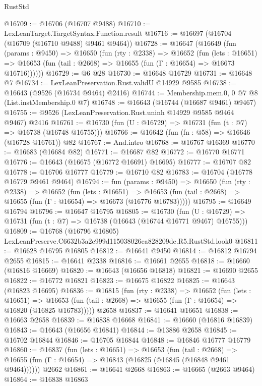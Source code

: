 \begin{lexlean}{RustStd}
\begin{coremodule}
@16709 := @16706 (@16707 @9488)
@16710 := LexLeanTarget.TargetSyntax.Function.result
@16716 := @16697 (@16704 (@16709 (@16710 @9488) @9461 @9464))
@16728 := @16647
    (@16649
      (fun (params : @9450) =>
      @16650
        (fun (rty : @2338) =>
        @16652
          (fun (lets : @16651) =>
          @16653 (fun (tail : @2668) => @16655 (fun (Γ : @16654) => @16673 @16716))))))
@16729 := @6 @28
@16730 := @16648 @16729
@16731 := @16648 @7
@16734 := LexLeanPreservation.Rust.validU @14929 @9585
@16738 := @16643 (@9526 (@16734 @9464) @2416)
@16744 := Membership.mem.{0, 0} @7 @8 (List.instMembership.{0} @7)
@16748 := @16643 (@16744 (@16687 @9461) @9467)
@16755 := @9526 (LexLeanPreservation.Rust.uninh @14929 @9585 @9464 @9467) @2416
@16761 := @16730 (fun (U : @16729) => @16731 (fun (t : @7) => @16738 (@16748 @16755)))
@16766 := @16642 (fun (fn : @58) => @16646 (@16728 @16761)) @82
@16767 := And.intro
@16768 := @16767 @16369
@16770 := @16683 (@16684 @82)
@16771 := @16687 @82
@16772 := @16770 @16771
@16776 := @16643 (@16675 (@16772 @16691) @16695)
@16777 := @16707 @82
@16778 := @16706 @16777
@16779 := @16710 @82
@16783 := @16704 (@16778 @16779 @9461 @9464)
@16794 := fun (params : @9450) =>
  @16650
    (fun (rty : @2338) =>
    @16652
      (fun (lets : @16651) =>
      @16653 (fun (tail : @2668) => @16655 (fun (Γ : @16654) => @16673 (@16776 @16783)))))
@16795 := @16649 @16794
@16796 := @16647 @16795
@16805 := @16730
    (fun (U : @16729) => @16731 (fun (t : @7) => @16738 (@16643 (@16744 @16771 @9467) @16755)))
@16809 := @16768 (@16796 @16805) LexLeanPreserve.C6632b3a2e999d115038026ca828209de.R5.RustStd.look0
@16811 := @16628 @16795 @16805
@16812 := @16641 @9450
@16814 := @16812 @16794 @2655
@16815 := @16641 @2338
@16816 := @16661 @2655
@16818 := @16660 (@16816 @16669)
@16820 := @16643 (@16656 @16818)
@16821 := @16690 @2655
@16822 := @16772 @16821
@16823 := @16675 @16822
@16825 := @16643 (@16823 @16695)
@16836 := @16815
    (fun (rty : @2338) =>
    @16652
      (fun (lets : @16651) =>
      @16653 (fun (tail : @2668) => @16655 (fun (Γ : @16654) => @16820 (@16825 @16783)))))
    @2658
@16837 := @16641 @16651
@16838 := @16663 @2658
@16839 := @16838 @16668
@16841 := @16660 (@16816 @16839)
@16843 := @16643 (@16656 @16841)
@16844 := @13886 @2658
@16845 := @16702 @16844
@16846 := @16705 @16844
@16848 := @16846 @16777 @16779
@16860 := @16837
    (fun (lets : @16651) =>
    @16653
      (fun (tail : @2668) =>
      @16655 (fun (Γ : @16654) => @16843 (@16825 (@16845 (@16848 @9461 @9464))))))
    @2662
@16861 := @16641 @2668
@16863 := @16665 (@2663 @9464)
@16864 := @16838 @16863

\end{coremodule}
\end{lexlean}
